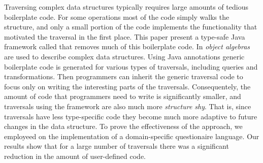 Traversing complex data structures typically requires large amounts of
tedious boilerplate code. For some operations most of the code simply
walks the structure, and only a small portion of the code implements
the functionality that motivated the traversal in the first place.
This paper present a type-safe Java framework called \name that
removes much of this boilerplate code. In \name \emph{object algebras}
are used to describe complex data structures. Using Java annotations
generic boilerplate code is generated for various types of traversals,
including queries and transformations. Then programmers can inherit
the generic traversal code to focus only on writing the interesting
parts of the traversals. Consequentely, the amount of code that
programmers need to write is significantly smaller, and traversals
using the \name framework are also much more \emph{structure
  shy}. That is, since traversals have less type-specific code they
become much more adaptive to future changes in the data structure.
To prove the effectiveness of the approach, we employeed \name 
on the implementation of a domain-specific questionaire 
language. Our results show that for a large number of traversals 
there was a significant reduction in the amount of user-defined code.

